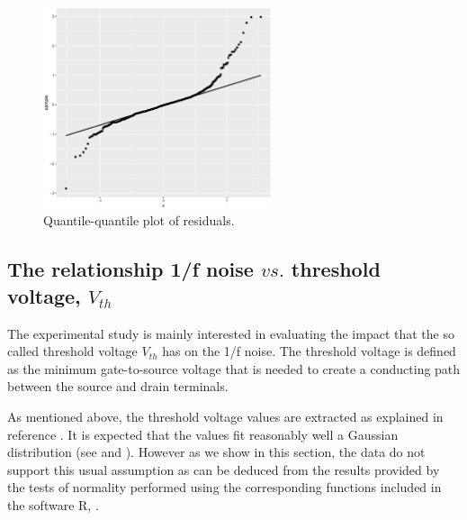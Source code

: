 \documentclass[sn-mathphys]{sn-jnl}%
\theoremstyle{thmstyleone}%
\theoremstyle{thmstyletwo}%
\theoremstyle{thmstylethree}%
\begin{document}
\begin{figure}[ht]
	\centerline{
		\includegraphics[width=0.6\textwidth]{Fig5_residuos.eps}}
	\caption{Quantile-quantile plot of residuals.}
	\label{fig:normalidad}
\end{figure}

\subsection{The relationship 1/f noise $vs.$ threshold voltage, $V_{th}$} \label{sec:noiseVSvth}
The experimental study is mainly interested in evaluating the impact that the so called threshold voltage $V_{th}$ has on the 1/f noise. The threshold voltage is defined as the minimum gate-to-source voltage that is needed to create a conducting path between the source and drain terminals.\

As mentioned above, the threshold voltage values are extracted as explained in reference \cite{Duty2016}. It is expected that the values fit reasonably well a Gaussian distribution (see \cite{Duty2016} and \cite{Schroder2006}). However as we show in this section, the data do not support this usual assumption as can be deduced from the results provided by the tests of normality performed using the corresponding functions included in the software R, \cite{R2021}.
\end{document}
